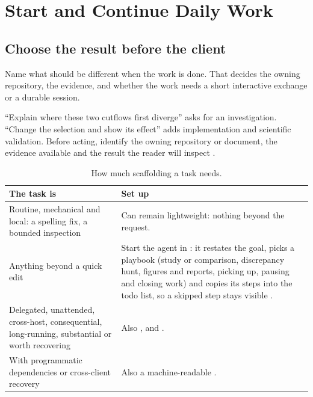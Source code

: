 \chapter{Start and Continue Daily Work}\label{ch:daily}
\section{Choose the result before the client}

\begin{headline}
  Name what should be different when the work is done. That decides the owning
  repository, the evidence, and whether the work needs a short interactive exchange or a
  durable session.
\end{headline}

``Explain where these two cutflows first diverge'' asks for an investigation. ``Change the
selection and show its effect'' adds implementation and scientific validation. Before
acting, identify the owning repository or document, the evidence available and the result
the reader will inspect \cite[rules 1--3]{skill:coordination}.

\begin{table}[H]
  \small
  \begin{tabularx}{\textwidth}{L{0.42\textwidth}Y}
    \toprule
    The task is & Set up \\
    \midrule
    Routine, mechanical and local: a spelling fix, a bounded inspection & Can remain lightweight:
    nothing beyond the request. \\
    Anything beyond a quick edit & Start the agent in : it restates
    the goal, picks a playbook (study or comparison, discrepancy hunt, figures and reports,
    picking up, pausing and closing work) and copies its steps into the todo list, so a skipped step stays
    visible \cite[Start; Playbooks]{skill:mode}. \\
    Delegated, unattended, cross-host, consequential, long-running, substantial or worth
    recovering & Also ,  and 
    \cite[rule 3]{skill:coordination}. \\
    With programmatic dependencies or cross-client recovery & Also a machine-readable
     \cite[Handoff marker]{skill:jobs}. \\
    \bottomrule
  \end{tabularx}
  \caption{How much scaffolding a task needs.}
  \label{tab:daily-scaffold}
\end{table}

